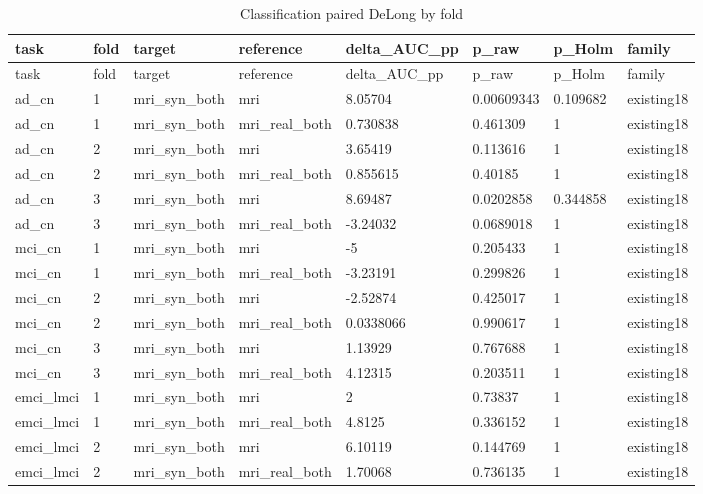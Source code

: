 \begin{landscape}
\begingroup
\footnotesize
\setlength{\tabcolsep}{4pt}
\begin{longtable}{llllllll}
\caption{Classification paired DeLong by fold}\label{tab:s-n16}\\
\toprule
task & fold & target & reference & delta\_AUC\_pp & p\_raw & p\_Holm & family \\
\midrule
\endfirsthead
\toprule
task & fold & target & reference & delta\_AUC\_pp & p\_raw & p\_Holm & family \\
\midrule
\endhead
\bottomrule
\endfoot
ad\_cn & 1 & mri\_syn\_both & mri & 8.05704 & 0.00609343 & 0.109682 & existing18 \\
ad\_cn & 1 & mri\_syn\_both & mri\_real\_both & 0.730838 & 0.461309 & 1 & existing18 \\
ad\_cn & 2 & mri\_syn\_both & mri & 3.65419 & 0.113616 & 1 & existing18 \\
ad\_cn & 2 & mri\_syn\_both & mri\_real\_both & 0.855615 & 0.40185 & 1 & existing18 \\
ad\_cn & 3 & mri\_syn\_both & mri & 8.69487 & 0.0202858 & 0.344858 & existing18 \\
ad\_cn & 3 & mri\_syn\_both & mri\_real\_both & -3.24032 & 0.0689018 & 1 & existing18 \\
mci\_cn & 1 & mri\_syn\_both & mri & -5 & 0.205433 & 1 & existing18 \\
mci\_cn & 1 & mri\_syn\_both & mri\_real\_both & -3.23191 & 0.299826 & 1 & existing18 \\
mci\_cn & 2 & mri\_syn\_both & mri & -2.52874 & 0.425017 & 1 & existing18 \\
mci\_cn & 2 & mri\_syn\_both & mri\_real\_both & 0.0338066 & 0.990617 & 1 & existing18 \\
mci\_cn & 3 & mri\_syn\_both & mri & 1.13929 & 0.767688 & 1 & existing18 \\
mci\_cn & 3 & mri\_syn\_both & mri\_real\_both & 4.12315 & 0.203511 & 1 & existing18 \\
emci\_lmci & 1 & mri\_syn\_both & mri & 2 & 0.73837 & 1 & existing18 \\
emci\_lmci & 1 & mri\_syn\_both & mri\_real\_both & 4.8125 & 0.336152 & 1 & existing18 \\
emci\_lmci & 2 & mri\_syn\_both & mri & 6.10119 & 0.144769 & 1 & existing18 \\
emci\_lmci & 2 & mri\_syn\_both & mri\_real\_both & 1.70068 & 0.736135 & 1 & existing18 \\

\end{longtable}
\end{landscape}
